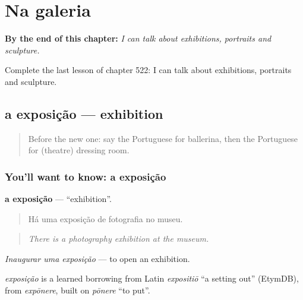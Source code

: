 
\chapter{Na galeria}
\label{ch:pt-na-galeria}

\begin{chapteropening}
\textbf{By the end of this chapter:} \emph{I can talk about exhibitions, portraits and sculpture.}

Complete the last lesson of chapter 522: I can talk about exhibitions, portraits and sculpture.
\end{chapteropening}

\section[a exposição]{a exposição — exhibition}

\label{lesson:PT-C522-exposicao}



\begin{quote}
Before the new one: say the Portuguese for ballerina, then the Portuguese for (theatre) dressing room.
\end{quote}

\subsection*{You'll want to know: a exposição}
\textbf{a exposição} — \textquotedblleft{}exhibition\textquotedblright{}.

\begin{quote}
Há uma exposição de fotografia no museu.
\end{quote}

\begin{quote}
\emph{There is a photography exhibition at the museum.}
\end{quote}

\emph{Inaugurar uma exposição} — to open an exhibition.

\begin{cousinweb}
\emph{exposição} is a learned borrowing from Latin \emph{expositiō} \textquotedblleft{}a setting out\textquotedblright{} (EtymDB), from \emph{expōnere}, built on \emph{pōnere} \textquotedblleft{}to put\textquotedblright{}.
\end{cousinweb}

